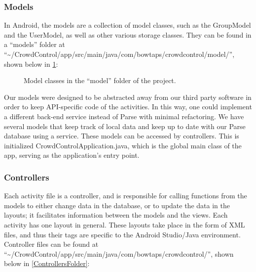  
 \subsubsection{Models}
In Android, the models are a collection of model classes, such as the GroupModel and the UserModel, as well as other various storage classes. They can be found in a ``models'' folder at ``\textasciitilde /CrowdControl/app/src/main/java/com/bowtaps/crowdcontrol/model/'', shown below in \ref{ModelFolder}:

	\begin{figure}[tbh!]
	\begin{center}
	\end{center}
	\caption{Model classes in the ``model'' folder of the project. \label{ModelFolder}}
	\end{figure}

 Our models were designed to be abstracted away from our third party software in order to keep API-specific code of the activities. In this way, one could implement a different back-end service instead of Parse with minimal refactoring. We have several models that keep track of local data and keep up to date with our Parse database using a service. These models can be accessed by controllers. This is initialized CrowdControlApplication.java, which is the global main class of the app, serving as the application's entry point.
 
 \subsubsection{Controllers}
 Each activity file is a controller, and is responsible for calling functions from the models to either change data in the database, or to update the data in the layouts; it facilitates information between the models and the views. Each activity has one layout in general. These layouts take place in the form of XML files, and thus their tags are specific to the Android Studio/Java environment. Controller files can be found at ``\textasciitilde /CrowdControl/app/src/main/java/com/bowtaps/crowdcontrol/'', shown below in \ref{ControllersFolder}:
 
